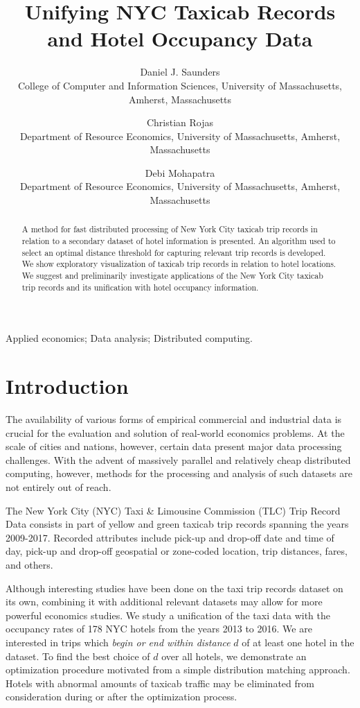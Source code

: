 \documentclass[useAMS, referee, usenatbib]{biom}
\title{Unifying NYC Taxicab Records and Hotel Occupancy Data}
\author
{Daniel J. Saunders \emailx{djsaunde@cs.umass.edu} \\
College of Computer and Information Sciences, University of Massachusetts, Amherst, Massachusetts
\and
Christian Rojas \emailx{rojas@resecon.umass.edu} \\
Department of Resource Economics, University of Massachusetts, 
Amherst, Massachusetts
\and
Debi Mohapatra \emailx{dmohapatra@umass.edu} \\
Department of Resource Economics, University of Massachusetts, 
Amherst, Massachusetts}
\begin{document}
\label{firstpage}

\begin{abstract}
A method for fast distributed processing of New York City taxicab trip records in relation to a secondary dataset of hotel information is presented. An algorithm used to select an optimal distance threshold for capturing relevant trip records is developed. We show exploratory visualization of taxicab trip records in relation to hotel locations. We suggest and preliminarily investigate applications of the New York City taxicab trip records and its unification with hotel occupancy information.
\end{abstract}

\begin{keywords}
Applied economics; Data analysis; Distributed computing.
\end{keywords}

\maketitle

\section{Introduction}
\label{s:intro}

The availability of various forms of empirical commercial and industrial data is crucial for the evaluation and solution of real-world economics problems. At the scale of cities and nations, however, certain data present major data processing challenges. With the advent of massively parallel and relatively cheap distributed computing, however, methods for the processing and analysis of such datasets are not entirely out of reach.

The New York City (NYC) Taxi \& Limousine Commission (TLC) Trip Record Data consists in part of yellow and green taxicab trip records spanning the years 2009-2017. Recorded attributes include pick-up and drop-off date and time of day, pick-up and drop-off geospatial or zone-coded location, trip distances, fares, and others.

Although interesting studies have been done on the taxi trip records dataset on its own, combining it with additional relevant datasets may allow for more powerful economics studies. We study a unification of the taxi data with the occupancy rates of 178 NYC hotels from the years 2013 to 2016. We are interested in trips which \textit{begin or end within distance} $d$ of at least one hotel in the dataset. To find the best choice of $d$ over all hotels, we demonstrate an optimization procedure motivated from a simple distribution matching approach. Hotels with abnormal amounts of taxicab traffic may be eliminated from consideration during or after the optimization process.
\end{document}
